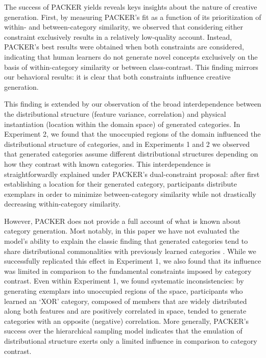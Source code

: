 \documentclass[12pt]{article}
\begin{document}
\begin{flushleft}
The success of PACKER yields reveals keys insights about the nature of creative generation. First, by measuring PACKER's fit as a function of its prioritization of within- and between-category similarity, we observed that considering either constraint exclusively results in a relatively low-quality account. Instead, PACKER's best results were obtained when both constraints are considered, indicating that human learners do not generate novel concepts exclusively on the basis of within-category similarity or between class-contrast. This finding mirrors our behavioral results: it is clear that both constraints influence creative generation. 

This finding is extended by our observation of the broad interdependence between the distributional structure (feature variance, correlation) and physical instantiation (location within the domain space) of generated categories. In Experiment 2, we found that the unoccupied regions of the domain influenced the distributional structure of categories, and in Experiments 1 and 2 we observed that generated categories assume different distributional structures depending on how they contrast with known categories. This interdependence is straightforwardly explained under PACKER's dual-constraint proposal: after first establishing a location for their generated category, participants distribute exemplars in order to minimize between-category similarity while not drastically decreasing within-category similarity. 

However, PACKER does not provide a full account of what is known about category generation. Most notably, in this paper we have not evaluated the model's ability to explain the classic finding that generated categories tend to share distributional commonalities with previously learned categories \citep[see][]{jern2013probabilistic,ward1994structured,ward1995s,ward2002role,smith1993constraining,marsh1999inadvertent}. While we successfully replicated this effect in Experiment 1, we also found that its influence was limited in comparison to the fundamental constraints imposed by category contrast. Even within Experiment 1, we found systematic inconsistencies: by generating exemplars into unoccupied regions of the space, participants who learned an `XOR' category, composed of members that are widely distributed along both features and are positively correlated in space, tended to generate categories with an opposite (negative) correlation. More generally, PACKER's success over the hierarchical sampling model indicates that the emulation of distributional structure exerts only a limited influence in comparison to category contrast.


\end{flushleft}
\end{document}
